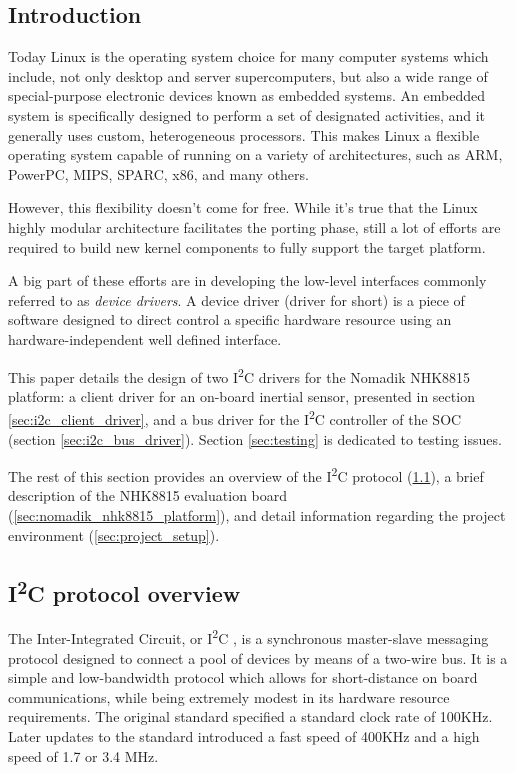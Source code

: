 \documentclass[a4paper,10pt]{article}
\newcommand{\iic}{I\textsuperscript{2}C }
\begin{document}
\vspace{6ex}	%
\begin{multicols}{2}

\section{Introduction}
Today Linux is the operating system choice for many computer systems which
include, not only desktop and server supercomputers, but also a wide range of 
special-purpose electronic devices known as embedded systems.
An embedded system is specifically designed to perform a set of designated
activities, and it generally uses custom, heterogeneous processors. This makes
Linux a flexible operating system capable of running on a variety of
architectures, such as ARM, PowerPC, MIPS, SPARC, x86, and many others.

However, this flexibility doesn't come for free. While it's true that the
Linux highly modular architecture facilitates the porting phase, still a
lot of efforts are required to build new kernel components to fully
support the target platform.

A big part of these efforts are in developing the low-level interfaces
commonly referred to as \emph{device drivers}.
A device driver (driver for short) is a piece of software designed to direct
control a specific hardware resource using an hardware-independent well defined
interface.

This paper details the design of two \iic drivers for the Nomadik NHK8815
platform: a client driver for an on-board inertial sensor, presented in
section \ref{sec:i2c_client_driver}, and a bus driver for the \iic controller
of the SOC (section \ref{sec:i2c_bus_driver}).
Section \ref{sec:testing} is dedicated to testing issues.

The rest of this section provides an overview of the \iic protocol
(\ref{sec:i2c_protocol_overview}), a brief description of the NHK8815 evaluation
board (\ref{sec:nomadik_nhk8815_platform}), and detail information regarding
the project environment (\ref{sec:project_setup}).



\subsection{I\textsuperscript{2}C protocol overview}
\label{sec:i2c_protocol_overview}
The Inter-Integrated Circuit, or \iic, is a synchronous master-slave messaging
protocol designed to connect a pool of devices by means of a two-wire bus.
It is a simple and low-bandwidth protocol which allows for short-distance on
board communications, while being extremely modest in its hardware resource
requirements. The original standard specified a standard clock rate of 100KHz.
Later updates to the standard introduced a fast speed of 400KHz and a high speed
of 1.7 or 3.4 MHz.


\end{multicols}
\end{document}
